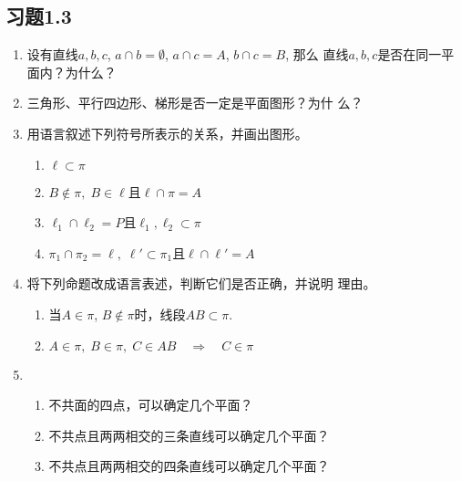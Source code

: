 \subsection*{习题1.3}
\begin{enumerate}
  \item 设有直线$a,b,c$, $a\cap b=\emptyset$, $a\cap c=A$, $b\cap c=B$, 那么
直线$a,b,c$是否在同一平面内？为什么？
\item 三角形、平行四边形、梯形是否一定是平面图形？为什
么？
\item 用语言叙述下列符号所表示的关系，并画出图形。
\begin{enumerate}
  \item $\ell\subset \pi$
  \item $B\notin \pi,\; B\in \ell$且$\ell\cap\pi=A$
  \item $\ell_1\cap \ell_2=P$且$\ell_1,\ell_2\subset \pi$
  \item $\pi_1\cap \pi_2=\ell,\; \ell'\subset \pi_1$且$\ell\cap \ell'=A$
\end{enumerate}


\item 将下列命题改成语言表述，判断它们是否正确，并说明
理由。
\begin{enumerate}
  \item 当$A\in \pi$, $B\notin \pi$时，线段$AB\subset \pi$.
  \item $A\in\pi,\; B\in\pi,\; C\in AB\quad \Rightarrow\quad C\in\pi $
\end{enumerate}

\item 
\begin{enumerate}
  \item 不共面的四点，可以确定几个平面？
  \item 不共点且两两相交的三条直线可以确定几个平面？
  \item 不共点且两两相交的四条直线可以确定几个平面？
\end{enumerate}


\end{enumerate}
